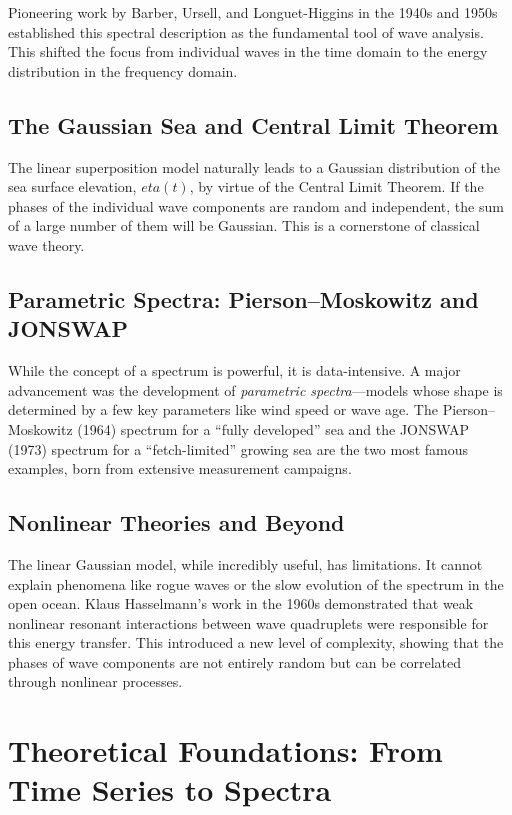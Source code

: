\documentclass[journal,10pt,twocolumn]{IEEEtran}
\def\eta{eta}%
\begin{document}
    Pioneering work by Barber, Ursell, and Longuet-Higgins in the 1940s and 1950s established this spectral description as the fundamental tool of wave analysis. This shifted the focus from individual waves in the time domain to the energy distribution in the frequency domain.

    \subsection{The Gaussian Sea and Central Limit Theorem}
    The linear superposition model naturally leads to a Gaussian distribution of the sea surface elevation, $\eta(t)$, by virtue of the Central Limit Theorem. If the phases of the individual wave components are random and independent, the sum of a large number of them will be Gaussian. This is a cornerstone of classical wave theory.

    \subsection{Parametric Spectra: Pierson--Moskowitz and JONSWAP}
    While the concept of a spectrum is powerful, it is data-intensive. A major advancement was the development of \textit{parametric spectra}---models whose shape is determined by a few key parameters like wind speed or wave age. The Pierson--Moskowitz (1964) spectrum for a ``fully developed'' sea and the JONSWAP (1973) spectrum for a ``fetch-limited'' growing sea are the two most famous examples, born from extensive measurement campaigns.

    \subsection{Nonlinear Theories and Beyond}
    The linear Gaussian model, while incredibly useful, has limitations. It cannot explain phenomena like rogue waves or the slow evolution of the spectrum in the open ocean. Klaus Hasselmann's work in the 1960s demonstrated that weak nonlinear resonant interactions between wave quadruplets were responsible for this energy transfer. This introduced a new level of complexity, showing that the phases of wave components are not entirely random but can be correlated through nonlinear processes.

    \section{Theoretical Foundations: From Time Series to Spectra}
\end{document}
